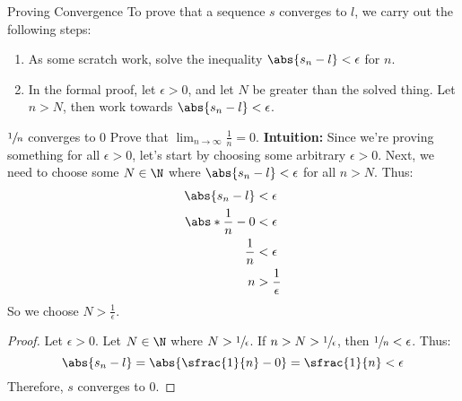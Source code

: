 \begin{tecbox}{Proving Convergence}{}
    To prove that a sequence $s$ converges to $l$, we carry out the following steps:
    \begin{enumerate}
        \item As some scratch work, solve the inequality $\abs{s_n - l} < \epsilon$ for $n$.
        \item In the formal proof, let $\epsilon > 0$, and let $N$ be greater than the solved thing. Let $n > N$, then work towards $\abs{s_n - l} < \epsilon$.
    \end{enumerate}
\end{tecbox}

\begin{exbox}{$\sfrac{1}{n}$ converges to $0$}{}
    Prove that $\lim_{n \to \infty} \frac{1}{n} = 0$.
    \tcblower
    \textbf{Intuition:} Since we're proving something for all $\epsilon > 0$, let's start by choosing some arbitrary $\epsilon > 0$. Next, we need to choose some $N \in \N$ where $\abs{s_n - l} < \epsilon$ for all $n > N$. Thus:
    \begin{align*}
        \abs{s_n - l} &< \epsilon \\
        \abs*{\frac{1}{n} - 0} &< \epsilon \\
        \frac{1}{n} &< \epsilon \\
        n &> \frac{1}{\epsilon}
    \end{align*}
    So we choose $N > \frac{1}{\epsilon}$.

    \begin{proof}
        Let $\epsilon > 0$. Let $N \in \N$ where $N > \sfrac{1}{\epsilon}$. If $n > N > \sfrac{1}{\epsilon}$, then $\sfrac{1}{n} < \epsilon$. Thus:
        \[ \abs{s_n - l} = \abs{\sfrac{1}{n} - 0} = \sfrac{1}{n} < \epsilon \]
        Therefore, $s$ converges to $0$.
    \end{proof}
\end{exbox}


